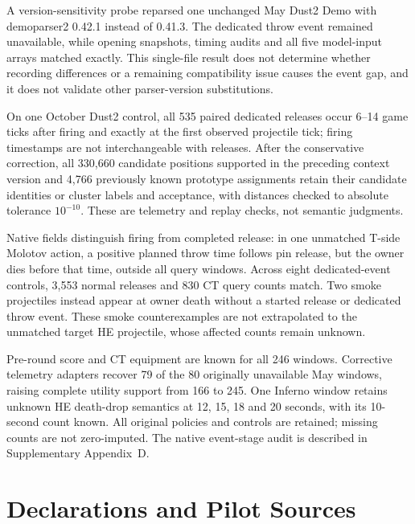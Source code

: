 A version-sensitivity probe reparsed one unchanged May Dust2 Demo with demoparser2 0.42.1 instead of 0.41.3. The dedicated throw event remained unavailable, while opening snapshots, timing audits and all five model-input arrays matched exactly. This single-file result does not determine whether recording differences or a remaining compatibility issue causes the event gap, and it does not validate other parser-version substitutions. %

On one October Dust2 control, all 535 paired dedicated releases occur 6--14 game ticks after firing and exactly at the first observed projectile tick; firing timestamps are not interchangeable with releases. After the conservative correction, all 330,660 candidate positions supported in the preceding context version and 4,766 previously known prototype assignments retain their candidate identities or cluster labels and acceptance, with distances checked to absolute tolerance $10^{-10}$. These are telemetry and replay checks, not semantic judgments. %

Native fields distinguish firing from completed release: in one unmatched T-side Molotov action, a positive planned throw time follows pin release, but the owner dies before that time, outside all query windows. Across eight dedicated-event controls, 3,553 normal releases and 830 CT query counts match. Two smoke projectiles instead appear at owner death without a started release or dedicated throw event. These smoke counterexamples are not extrapolated to the unmatched target HE projectile, whose affected counts remain unknown. %

Pre-round score and CT equipment are known for all 246 windows. Corrective telemetry adapters recover 79 of the 80 originally unavailable May windows, raising complete utility support from 166 to 245. One Inferno window retains unknown HE death-drop semantics at 12, 15, 18 and 20 seconds, with its 10-second count known. All original policies and controls are retained; missing counts are not zero-imputed. The native event-stage audit is described in Supplementary Appendix~D. %

\section{Declarations and Pilot Sources}




